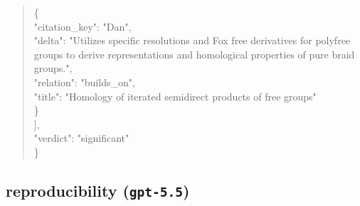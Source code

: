 \documentclass[11pt]{article}
\begin{document}
\begin{quote}
    \{\\
      "citation\_key": "Dan",\\
      "delta": "Utilizes specific resolutions and Fox free derivatives for polyfree groups to derive representations and homological properties of pure braid groups.",\\
      "relation": "builds\_on",\\
      "title": "Homology of iterated semidirect products of free groups"\\
    \}\\
  ],\\
  "verdict": "significant"\\
\}\\
\end{quote}

\subsection*{reproducibility (\texttt{gpt-5.5})}
\end{document}
